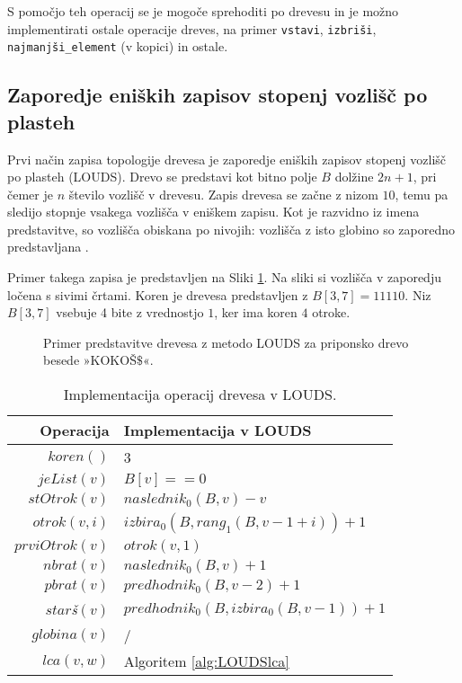 S pomočjo teh operacij se je mogoče sprehoditi po drevesu in je možno implementirati ostale operacije dreves, na primer \texttt{vstavi}, \texttt{izbriši}, \texttt{najmanjši\_element} (v kopici) in ostale.

\subsection{Zaporedje eniških zapisov stopenj vozlišč po plasteh}\label{sec:LOUDS}

Prvi način zapisa topologije drevesa je zaporedje eniških zapisov stopenj vozlišč po plasteh (LOUDS). Drevo se predstavi kot bitno polje $B$ dolžine $2n+1$, pri čemer je $n$ število vozlišč v drevesu. Zapis drevesa se začne z nizom $10$, temu pa sledijo stopnje vsakega vozlišča v eniškem zapisu. Kot je razvidno iz imena predstavitve, so vozlišča obiskana po nivojih: vozlišča z isto globino so zaporedno predstavljana \cite{Navarro2016}.

Primer takega zapisa je predstavljen na Sliki \ref{fig:LOUDS}. Na sliki si vozlišča v zaporedju ločena s sivimi črtami. Koren je drevesa predstavljen z $B[3,7]=11110$. Niz $B[3,7]$ vsebuje 4 bite z vrednostjo $1$, ker ima koren $4$ otroke.

\begin{figure}[htb]
    \begin{center}
        
        \caption{Primer predstavitve drevesa z metodo LOUDS za priponsko drevo besede »KOKOŠ$\$$«.} 
        \label{fig:LOUDS}
    \end{center}
\end{figure}

\begin{table}[htb]
    \centering
    \caption{Implementacija operacij drevesa v LOUDS.}
    \begin{tabular}{r|l}
\textbf{Operacija}& \textbf{Implementacija v LOUDS} \\\hline
         $koren()$& 3\\
         $jeList(v)$& $B[v]==0$\\
         $stOtrok(v)$& $naslednik_0(B,v)-v$\\
         $otrok(v,i)$& $izbira_0(B, rang_1(B, v - 1 + i))+1$\\
         $prviOtrok(v)$& $otrok(v,1)$\\
         $nbrat(v)$& $naslednik_0(B,v)+1$ \\
         $pbrat(v)$& $predhodnik_0(B,v-2)+1$ \\
         $star$\textit{š}$(v)$& $predhodnik_0(B,izbira_0(B,v-1))+1$ \\
         $globina(v)$& / \\
         $lca(v,w)$&  Algoritem \ref{alg:LOUDSlca}\\

    \end{tabular}
    \label{tab:LOUDSop}
\end{table}

